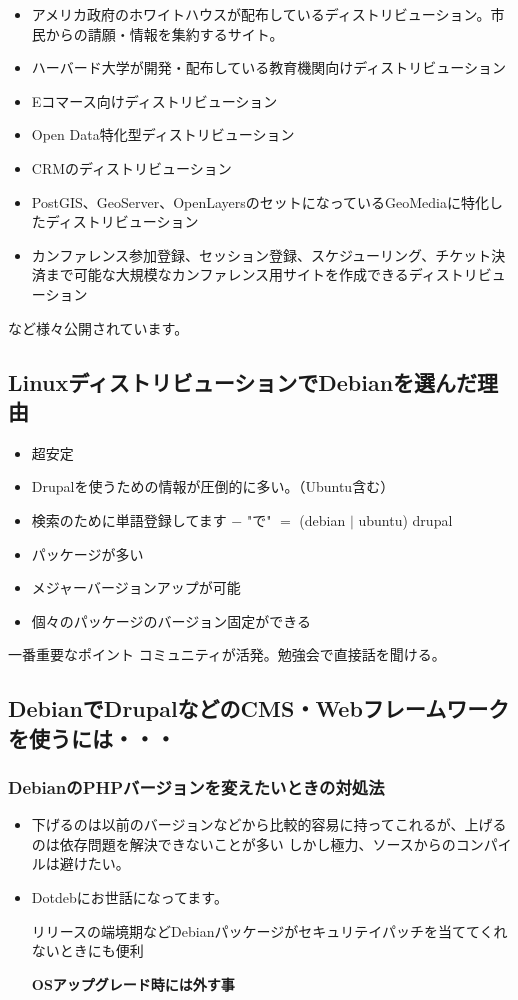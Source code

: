 \documentclass[mingoth,a4paper]{jsarticle}
\begin{document}
\begin{itemize}
\item アメリカ政府のホワイトハウスが配布しているディストリビューション。市民からの請願・情報を集約するサイト。
\item ハーバード大学が開発・配布している教育機関向けディストリビューション
\item Eコマース向けディストリビューション
\item Open Data特化型ディストリビューション
\item CRMのディストリビューション
\item PostGIS、GeoServer、OpenLayersのセットになっているGeoMediaに特化したディストリビューション
\item カンファレンス参加登録、セッション登録、スケジューリング、チケット決済まで可能な大規模なカンファレンス用サイトを作成できるディストリビューション
\end{itemize}

など様々公開されています。
\cite{distributions}


\subsection{LinuxディストリビューションでDebianを選んだ理由}
\begin{itemize}
\item 超安定
\item Drupalを使うための情報が圧倒的に多い。（Ubuntu含む）
\item 検索のために単語登録してます $-$ "で" $=$ (debian $|$ ubuntu) drupal
\item パッケージが多い
\item メジャーバージョンアップが可能
\item 個々のパッケージのバージョン固定ができる
\end{itemize}

\begin{itembox}[l]{一番重要なポイント}
 コミュニティが活発。勉強会で直接話を聞ける。
\end{itembox}


\subsection{DebianでDrupalなどのCMS・Webフレームワークを使うには・・・}
\subsubsection{DebianのPHPバージョンを変えたいときの対処法}
\begin{itemize}
\item 下げるのは以前のバージョンなどから比較的容易に持ってこれるが、上げるのは依存問題を解決できないことが多い
  しかし極力、ソースからのコンパイルは避けたい。
\item Dotdebにお世話になってます。\cite{dotdeb}

  リリースの端境期などDebianパッケージがセキュリテイパッチを当ててくれないときにも便利

  {\bf OSアップグレード時には外す事}
\end{itemize}
\end{document}
